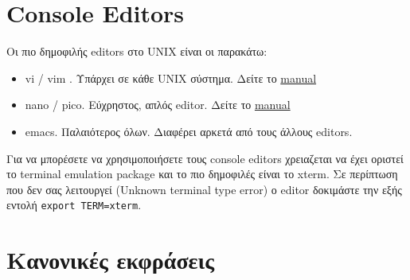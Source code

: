 







\section{Console Editors}
Οι πιο δημοφιλής editors στο UNIX είναι οι παρακάτω:
\begin{itemize}
	\item vi / vim \cite{Neil:2015}. Υπάρχει σε κάθε UNIX σύστημα. Δείτε το \href{https://www.cs.colostate.edu/helpdocs/vi.html}{manual}
	\item nano / pico. Εύχρηστος, απλός editor. Δείτε το \href{http://documentation.its.umich.edu/node/241}{manual}
	\item emacs. Παλαιότερος όλων. Διαφέρει αρκετά από τους άλλους editors.
\end{itemize}

Για να μπορέσετε να χρησιμοποιήσετε τους console editors χρειαζεται να έχει οριστεί το terminal emulation package και το πιο δημοφιλές είναι το xterm. Σε περίπτωση που δεν σας λειτουργεί (Unknown terminal type error) ο editor δοκιμάστε την εξής εντολή \texttt{export TERM=xterm}.




\section{Κανονικές εκφράσεις}



